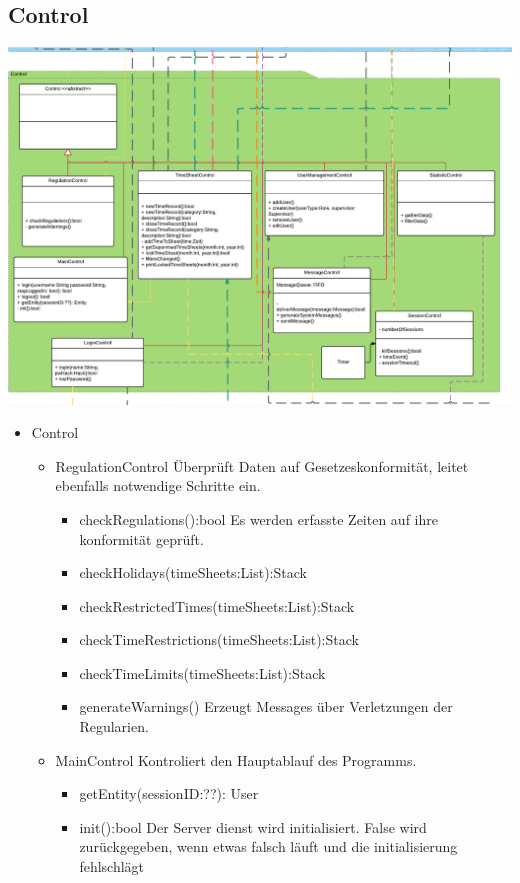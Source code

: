 \begin{itemize}
    \subsection{Control}
        \includegraphics[width=\linewidth]{Diagramms/class/control.pdf}\\
        \begin{itemize}
            \item{Control}
                \begin{itemize}
                    \item{RegulationControl}
                       Überprüft Daten auf Gesetzeskonformität, leitet ebenfalls notwendige Schritte ein.
                       \begin{itemize}
                           \item{checkRegulations():bool}
                            Es werden erfasste Zeiten auf ihre konformität geprüft.
                            \item{checkHolidays(timeSheets:List):Stack}
                            \item{checkRestrictedTimes(timeSheets:List):Stack}
                            \item{checkTimeRestrictions(timeSheets:List):Stack}
                            \item{checkTimeLimits(timeSheets:List):Stack}
                           \item{generateWarnings()}
                            Erzeugt Messages über Verletzungen der Regularien.
                       \end{itemize}

                    \item{MainControl}
                        Kontroliert den Hauptablauf des Programms.
                        \begin{itemize}
                             \item{getEntity(sessionID:??): User}
                             \item{init():bool}
                                Der Server dienst wird initialisiert.
                                False wird zurückgegeben, wenn etwas falsch läuft und die initialisierung fehlschlägt
                        \end{itemize}


\end{itemize}
\end{itemize}
\end{itemize}
